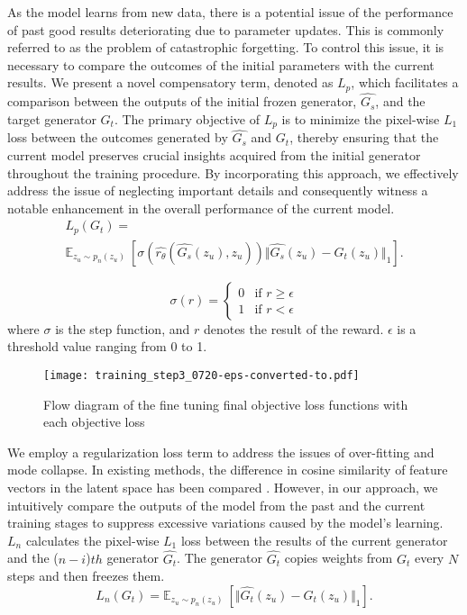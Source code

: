 \documentclass[lettersize,journal]{IEEEtran}
\begin{document}
 As the model learns from new data, there is a potential issue of the performance of past good results deteriorating due to parameter updates. This is commonly referred to as the problem of catastrophic forgetting. To control this issue, it is necessary to compare the outcomes of the initial parameters with the current results. We present a novel compensatory term, denoted as $L_p$, which facilitates a comparison between the outputs of the initial frozen generator, $\hat{G_s}$, and the target generator $G_t$. The primary objective of $L_p$ is to minimize the pixel-wise $L_1$ loss between the outcomes generated by $\hat{G_s}$ and $G_t$, thereby ensuring that the current model preserves crucial insights acquired from the initial generator throughout the training procedure. By incorporating this approach, we effectively address the issue of neglecting important details and consequently witness a notable enhancement in the overall performance of the current model.
\begin{multline}
\label{Lp_loss}
L_{p}(G_t) = \\
\mathbb{E}_{z_u\sim p_n(z_u)} \ [\sigma(\hat{r_\theta}(\hat{G_s}(z_u), z_u))\Vert \hat{G_s}(z_u)-G_t(z_u) {\Vert}_1].    
\end{multline}

\begin{equation}
\label{sigmoid}
\sigma(r) = \begin{cases} 0   & \text{if } r \geq \epsilon \\
        1   & \text{if } r < \epsilon
    \end {cases}
\end{equation}
where $\sigma$ is the step function, and $r$ denotes the result of the reward. $\epsilon$ is a threshold value ranging from 0 to 1.\\

\begin{figure}[!t]
\centering
\texttt{[image: training\_step3\_0720-eps-converted-to.pdf]}
\caption{Flow diagram of the fine tuning final objective loss functions with each objective loss }
\label{step3_total_loss}
\end{figure}

We employ a regularization loss term to address the issues of over-fitting and mode collapse. In existing methods, the difference in cosine similarity of feature vectors in the latent space has been compared \cite{zhu2021mind, kwon2023one}. However, in our approach, we intuitively compare the outputs of the model from the past and the current training stages to suppress excessive variations caused by the model's learning. $L_{n}$ calculates the pixel-wise $L_1$ loss between the results of the current generator and the ($n-i$)$th$ generator $\hat{G_t}$. The generator $\hat{G_t}$ copies weights from $G_t$ every $N$ steps and then freezes them.
\begin{equation}
\label{Ln_loss}
L_{n}(G_t) = \mathbb{E}_{z_u\sim p_n(z_u)} \ [\Vert \hat{G_t}(z_u)-G_t(z_u) {\Vert}_1].
\end{equation}
\end{document}
